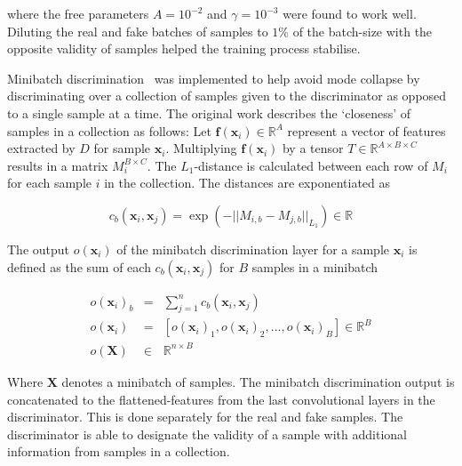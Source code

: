 \documentclass[twocolumn]{article}
\numberwithin{equation}{section}
\begin{document}
where the free parameters $A=10^{-2}$ and $\gamma=10^{-3}$ were found to work well. Diluting the real and fake batches of 
samples to $1\%$ of the batch-size with the opposite validity of samples helped the training process stabilise.

Minibatch discrimination~\cite{gantricks_sali} was implemented to help avoid mode collapse by discriminating over a 
collection of samples given to the discriminator as opposed to a single sample at a time. The original work describes 
the `closeness' of samples in a collection as follows: Let $\mathbf{f}(\bm{x}_i) \in \mathbb{R}^A$ represent a vector of 
features extracted by $D$ for sample $\mathbf{x}_i$. Multiplying $\mathbf{f}(\bm{x}_i)$ by a tensor $T \in \mathbb{R}^{A\times 
B\times C}$ results in a matrix $M_i^{B\times C}$. The $L_1$-distance is calculated between each row of $M_i$ for each sample 
$i$ in the collection. The distances are exponentiated as

\begin{equation}
    c_b(\mathbf{x}_i, \mathbf{x}_j) = \exp({- ||M_{i,b} - M_{j,b}||_{L_1}}) \in \mathbb{R} \nonumber
\end{equation}

The output $o(\mathbf{x}_i)$ of the minibatch discrimination layer for a sample $\mathbf{x}_i$ is defined as the sum of 
each $c_b(\mathbf{x}_i, \mathbf{x}_j)$ for $B$ samples in a minibatch

\begin{eqnarray}
    o(\mathbf{x}_i)_b &=& \sum_{j=1}^n c_b(\mathbf{x}_i, \mathbf{x}_j) \nonumber \\
    o(\mathbf{x}_i) &=& [o(\mathbf{x}_i)_1, o(\mathbf{x}_i)_2, ..., o(\mathbf{x}_i)_B] \in \mathbb{R}^B \nonumber\\
    o(\mathbf{X}) &\in& \mathbb{R}^{n \times B} \nonumber
\end{eqnarray}

Where $\mathbf{X}$ denotes a minibatch of samples. The minibatch discrimination output is concatenated to the 
flattened-features from the last convolutional layers in the discriminator. This is done separately for the real and 
fake samples. The discriminator is able to designate the validity of a sample with additional information from samples 
in a collection.

\end{document}
